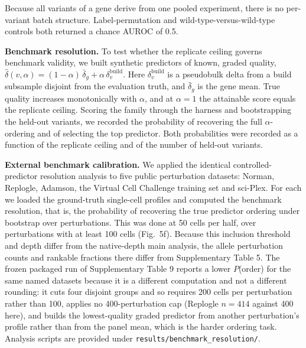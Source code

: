 \documentclass[11pt,letterpaper]{article}
\begin{document}
Because all variants of a gene derive from one pooled experiment, there is no per-variant batch structure. Label-permutation and wild-type-versus-wild-type controls both returned a chance AUROC of 0.5.

\textbf{Benchmark resolution.} To test whether the replicate ceiling governs benchmark validity, we built synthetic predictors of known, graded quality, $\hat{\delta}(v,\alpha) = (1-\alpha)\,\bar{\delta}_g + \alpha\,\delta_v^{\mathrm{build}}$. Here $\delta_v^{\mathrm{build}}$ is a pseudobulk delta from a build subsample disjoint from the evaluation truth, and $\bar{\delta}_g$ is the gene mean. True quality increases monotonically with $\alpha$, and at $\alpha=1$ the attainable score equals the replicate ceiling. Scoring the family through the harness and bootstrapping the held-out variants, we recorded the probability of recovering the full $\alpha$-ordering and of selecting the top predictor. Both probabilities were recorded as a function of the replicate ceiling and of the number of held-out variants.

\textbf{External benchmark calibration.} We applied the identical controlled-predictor resolution analysis to five public perturbation datasets: Norman, Replogle, Adamson, the Virtual Cell Challenge training set\cite{VirtualCellChallenge2025} and sci-Plex\cite{SciPlex2020}. For each we loaded the ground-truth single-cell profiles and computed the benchmark resolution, that is, the probability of recovering the true predictor ordering under bootstrap over perturbations. This was done at 50 cells per half, over perturbations with at least 100 cells (Fig.~5f). Because this inclusion threshold and depth differ from the native-depth main analysis, the allele perturbation counts and rankable fractions there differ from Supplementary Table 5. The frozen packaged run of Supplementary Table 9 reports a lower $P$(order) for the same named datasets because it is a different computation and not a different rounding: it cuts four disjoint groups and so requires 200 cells per perturbation rather than 100, applies no 400-perturbation cap (Replogle $n = 414$ against 400 here), and builds the lowest-quality graded predictor from another perturbation's profile rather than from the panel mean, which is the harder ordering task. Analysis scripts are provided under \texttt{results/benchmark\_resolution/}.
\end{document}
